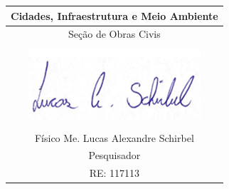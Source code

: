 \begin{table}[b]
  \begin{adjustwidth}{0pt}{-9cm} %
  \centering
  \setlength{\arrayrulewidth}{0.9pt} %
  \begin{tabular}{|c|}
    \hline
    Cidades, Infraestrutura e Meio Ambiente \\
    \hline
    Seção de Obras Civis \\
    \hline \\[1.0pt]
    \includegraphics{../figuras/assinatura.png} \\[5.0pt]
    \hline \\[-25.0pt]
    Físico Me. Lucas Alexandre Schirbel \\[-7.0pt]
    Pesquisador \\[-7.0pt]
    RE: 117113 \\[0.0pt]
    \hline
  \end{tabular}
  \end{adjustwidth}
\end{table}
